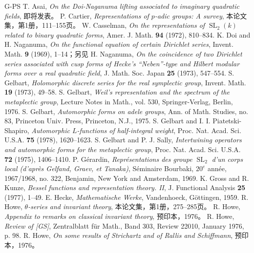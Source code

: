 \begin{thebibliography}{G-PS}
 T. Asai, \emph{On the Doi-Naganuma lifting associated to imaginary quadratic fields}, 即将发表。
 P. Cartier, \emph{Representations of $p$-adic groups: A survey}, 本论文集，第1册，111--155页。
 W. Casselman, \emph{On the representations of $\operatorname{SL}_2(k)$ related to binary quadratic forms}, Amer. J. Math. \textbf{94} (1972), 810--834.
 K. Doi and H. Naganuma, \emph{On the functional equation of certain Dirichlet series}, Invent. Math. \textbf{9} (1969), 1--14；另见 H. Naganuma, \emph{On the coincidence of two Dirichlet series associated with cusp forms of Hecke's ``Neben''-type and Hilbert modular forms over a real quadratic field}, J. Math. Soc. Japan \textbf{25} (1973), 547--554.
 S. Gelbart, \emph{Holomorphic discrete series for the real symplectic group}, Invent. Math. \textbf{19} (1973), 49--58.
 S. Gelbart, \emph{Weil's representation and the spectrum of the metaplectic group}, Lecture Notes in Math., vol. 530, Springer-Verlag, Berlin, 1976.
 S. Gelbart, \emph{Automorphic forms on adele groups}, Ann. of Math. Studies, no. 83, Princeton Univ. Press, Princeton, N.J., 1975.
 S. Gelbart and I. I. Piatetski-Shapiro, \emph{Automorphic $L$-functions of half-integral weight}, Proc. Nat. Acad. Sci. U.S.A. \textbf{75} (1978), 1620--1623.
 S. Gelbart and P. J. Sally, \emph{Intertwining operators and automorphic forms for the metaplectic group}, Proc. Nat. Acad. Sci. U.S.A. \textbf{72} (1975), 1406--1410.
 P. Gérardin, \emph{Représentations des groupe $\operatorname{SL}_2$ d'un corps local (d'après Gelfand, Graev, et Tanaka)}, Séminaire Bourbaki, $20^e$ année, 1967/1968, no. 322, Benjamin, New York and Amsterdam, 1969.
 K. Gross and R. Kunze, \emph{Bessel functions and representation theory. II}, J. Functional Analysis \textbf{25} (1977), 1--49.
 E. Hecke, \emph{Mathematische Werke}, Vandenhoeck, Göttingen, 1959.
 R. Howe, \emph{$\theta$-series and invariant theory}, 本论文集，第1册，275--285页。
 R. Howe, \emph{Appendix to remarks on classical invariant theory}, 预印本，1976。
 R. Howe, \emph{Review of [GS]}, Zentralblatt für Math., Band 303, Review 22010, January 1976, p. 98.
 R. Howe, \emph{On some results of Strichartz and of Rallis and Schiffmann}, 预印本，1976。

\end{thebibliography}
